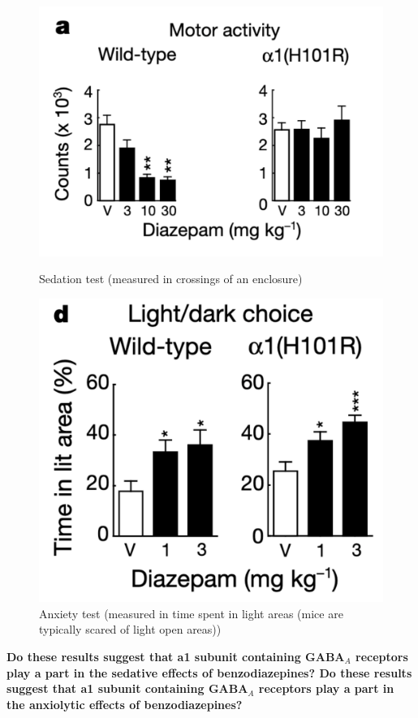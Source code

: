 \documentclass{article}
\begin{document}
\FloatBarrier
\begin{figure}
\centering
\begin{minipage}{.4\textwidth}
  \includegraphics[width=.99\linewidth]{a1_sedation.png}
  \caption{Sedation test (measured in crossings of an enclosure)}
  \label{fig:test1}
\end{minipage}%
\begin{minipage}{.4\textwidth}
  \centering
  \includegraphics[width=.8\linewidth]{a1_anxiety.png}
  \caption{Anxiety test (measured in time spent in light areas (mice are typically scared of light open areas))}
  \label{fig:test2}
\end{minipage}
\end{figure}
\FloatBarrier

\textbf{Do these results suggest that a1 subunit containing GABA$_A$ receptors play a part in the sedative effects of benzodiazepines? Do these results suggest that a1 subunit containing GABA$_A$ receptors play a part in the anxiolytic effects of benzodiazepines?}
\end{document}
